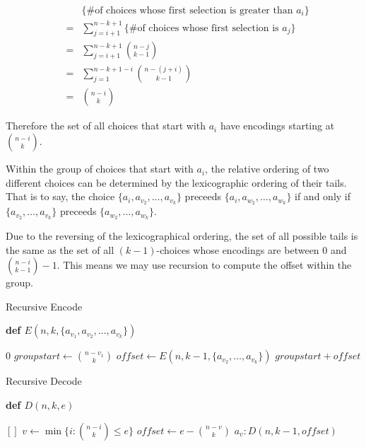 \documentclass[preprint]{sigplanconf}
\begin{document}
	\begin{eqnarray*}
		&   & \text{\{\# of choices whose first selection is greater than $a_i$\}} \\ 
		& = & \sum_{j=i+1}^{n-k+1}{\text{\{\# of choices whose first selection is $a_j$\}}} \\
		& = & \sum_{j=i+1}^{n-k+1}{\binom{n-j}{k-1}} \\
		& = & \sum_{j=1}^{n-k+1-i}{\binom{n-(j+i)}{k-1}} \\
		& = & \binom{n-i}{k}
	\end{eqnarray*}
	
	Therefore the set of all choices that start with $a_i$ have encodings starting at $\binom{n-i}{k}$.
		
	Within the group of choices that start with $a_i$, the relative ordering of two different choices can be determined by the lexicographic ordering of their tails.
	That is to say, the choice $\{ a_i, a_{v_2}, \ldots, a_{v_{k}} \}$ preceeds $\{ a_i, a_{w_2}, \ldots, a_{w_{k}} \}$ if and only if
	$\{ a_{v_2}, \ldots, a_{v_{k}} \}$ preceeds $\{ a_{w_2}, \ldots, a_{w_{k}} \}$.
	
	Due to the reversing of the lexicographical ordering, the set of all possible tails is the same as the set of all $(k-1)$-choices whose encodings are between $0$ and $\binom{n-i}{k-1}-1$.
	This means we may use recursion to compute the offset within the group.
	
	\begin{algorithm}[!ht] %
	\caption{Recursive Encode}
	\label{alg:E}
	
	\textbf{def $E(n,k,\{a_{v_1},a_{v_2},\ldots,a_{v_k}\})$}
	\begin{algorithmic}[1]
	\RETURN $0$
	\ELSE
	\STATE $groupstart \gets \binom{n-v_1}{k}$
	\STATE $offset \gets E(n,k-1,\{a_{v_2},\ldots,a_{v_k}\})$
	\RETURN $groupstart + offset$
	\ENDIF
	\end{algorithmic}
	
	\end{algorithm}
	\begin{algorithm}[!ht] %
	\caption{Recursive Decode}
	\label{alg:D}
	
	\textbf{def $D(n,k,e)$}
	\begin{algorithmic}[1]
	\RETURN $[]$
	\ELSE
	\STATE $v \gets \min \{ i : \binom{n-i}{k} \le e \}$
	\STATE $offset \gets e - \binom{n-v}{k}$
	\RETURN $a_v : D(n, k-1, offset)$
	\ENDIF
	\end{algorithmic}
		
	\end{algorithm}
	
\end{document}
